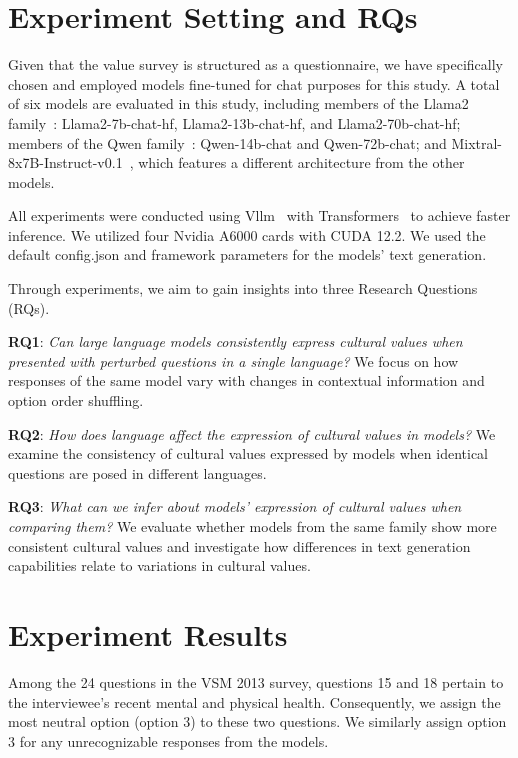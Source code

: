 \documentclass[11pt]{article}
\begin{document}
\section{Experiment Setting and RQs}
\label{sec:expDesign}

Given that the value survey is structured as a questionnaire, we have specifically chosen and employed models fine-tuned for chat purposes for this study. A total of six models are evaluated in this study,  including members of the Llama2 family~\cite{touvron2023llama}: Llama2-7b-chat-hf, Llama2-13b-chat-hf, and Llama2-70b-chat-hf; members of the Qwen family~\cite{bai2023qwen}: Qwen-14b-chat and Qwen-72b-chat; and Mixtral-8x7B-Instruct-v0.1~\cite{jiang2024mixtral}, which features a different architecture from the other models.

All experiments were conducted using Vllm~\cite{kwon2023efficient} with Transformers~\cite{wolf2020huggingfaces} to achieve faster inference. We utilized four Nvidia A6000 cards with CUDA 12.2. We used the default config.json and framework parameters for the models' text generation.

Through experiments, we aim to gain insights into three Research Questions (RQs).

\noindent\textbf{RQ1}: \textit{Can large language models consistently express cultural values when presented with perturbed questions in a single language?} We focus on how responses of the same model vary with changes in contextual information and option order shuffling.

\noindent\textbf{RQ2}: \textit{How does language affect the expression of cultural values in models?} We examine the consistency of cultural values expressed by models when identical questions are posed in different languages.

\noindent\textbf{RQ3}: \textit{What can we infer about models' expression of cultural values when comparing them?} We evaluate whether models from the same family show more consistent cultural values and investigate how differences in text generation capabilities relate to variations in cultural values.

\section{Experiment Results}
\label{sec:expResults}

Among the 24 questions in the VSM 2013 survey, questions 15 and 18 pertain to the interviewee's recent mental and physical health. Consequently, we assign the most neutral option (option 3) to these two questions. We similarly assign option 3 for any unrecognizable responses from the models.
\end{document}
